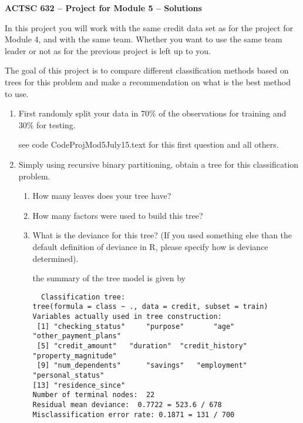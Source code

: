\documentclass[11pt]{article}
\begin{document}
\begin{center}
{\large \bf ACTSC 632 -- Project for Module 5 -- Solutions} \\

\end{center}

In this project you will work with the same credit data set as for the project for Module 4, and with the same team. Whether you want to use the same team leader or not as for the previous project is left up to you. 

The goal of this project is to compare different classification methods based on  trees for this problem and make a recommendation on what is the best method to use.


\begin{enumerate}
  \item First randomly split your data in 70\% of the observations for training and 30\% for testing.

 see code CodeProjMod5July15.text for  this first question and all others.

\item Simply using recursive binary partitioning, obtain a tree for this classification problem.

  \begin{enumerate}
  \item How many leaves does your tree have?
    \item How many factors were used to build this tree?
  \item What is the deviance for this tree? (If you used something else than the default definition of deviance in R, please specify how is deviance determined).
  
   the summary of the tree model is given by
  
  \begin{verbatim}
  Classification tree:
tree(formula = class ~ ., data = credit, subset = train)
Variables actually used in tree construction:
 [1] "checking_status"     "purpose"       "age"       "other_payment_plans"
 [5] "credit_amount"   "duration"  "credit_history"   "property_magnitude" 
 [9] "num_dependents"      "savings"   "employment"    "personal_status"    
[13] "residence_since"    
Number of terminal nodes:  22 
Residual mean deviance:  0.7722 = 523.6 / 678 
Misclassification error rate: 0.1871 = 131 / 700 
\end{verbatim}
  

\end{enumerate}
\end{enumerate}
\end{document}
